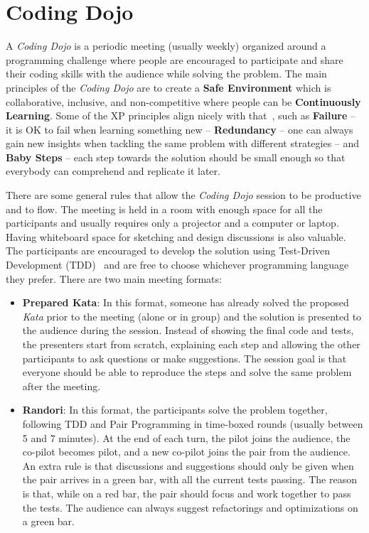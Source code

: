 \section{Coding Dojo}\label{sec:dojo}

A \emph{Coding Dojo} is a periodic meeting (usually weekly) organized around a programming challenge
where people are encouraged to participate and share their coding skills with the audience while
solving the problem. The main principles of the \emph{Coding Dojo} are to create a
\textbf{Safe Environment} which is collaborative, inclusive, and non-competitive where people can
be \textbf{Continuously Learning}. Some of the XP principles align nicely with that~\cite{XP2E}, such
as \textbf{Failure} -- it is OK to fail when learning something new -- \textbf{Redundancy} -- one can
always gain new insights when tackling the same problem with different strategies -- and
\textbf{Baby Steps} -- each step towards the solution should be small enough so that everybody can
comprehend and replicate it later.

There are some general rules that allow the \emph{Coding Dojo} session to be productive and to flow.
The meeting is held in a room with enough space for all the participants and usually requires only a
projector and a computer or laptop. Having whiteboard space for sketching and design discussions is also
valuable. The participants are encouraged to develop the solution using Test-Driven Development
(TDD)~\cite{TDD} and are free to choose whichever programming language they prefer. There are two main
meeting formats:

\begin{itemize}
	\item \textbf{Prepared Kata}: In this format, someone has already solved the proposed \emph{Kata}
	prior to the meeting (alone or in group) and the solution is presented to the audience during the session.
	Instead of showing the final code and tests, the presenters start from scratch, explaining each step
	and allowing the other participants to ask questions or make suggestions. The session goal is that
	everyone should be able to reproduce the steps and solve the same problem after the meeting.
	
	\item \textbf{Randori}: In this format, the participants solve the problem together, following TDD and
	Pair Programming in time-boxed rounds (usually between 5 and 7 minutes). At the end of each turn, the
	pilot joins the audience, the co-pilot becomes pilot, and a new co-pilot joins the pair from the
	audience. An extra rule is that discussions and suggestions should only be given when the pair arrives
	in a green bar, with all the current tests passing. The reason is that, while on a red bar, the pair should
	focus and work together to pass the tests. The audience can always suggest refactorings and
	optimizations on a green bar.
\end{itemize}

